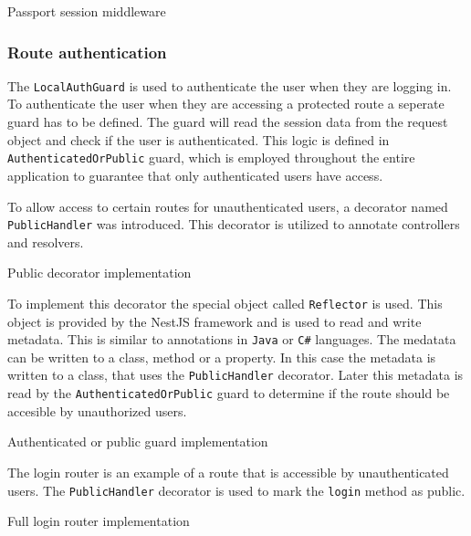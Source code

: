 \documentclass[../main.tex]{subfiles}
\begin{document}
\begin{listing}[H]
  \caption{Passport session middleware}
\end{listing}

\subsubsection{Route authentication}

The \texttt{LocalAuthGuard} is used to authenticate the user when they are logging in. To authenticate the user when they are accessing a protected route
a seperate guard has to be defined. The guard will read the session data from the request object and check if the user is authenticated.
This logic is defined in \texttt{AuthenticatedOrPublic} guard, which is employed throughout the entire application to guarantee that only authenticated users have access.


To allow access to certain routes for unauthenticated users, a decorator named \texttt{PublicHandler} was introduced. This decorator is utilized to annotate controllers and resolvers.

\begin{listing}[H]
  \caption{Public decorator implementation}
\end{listing}

To implement this decorator the special object called \texttt{Reflector} is used. This object is provided by the NestJS framework and is used to read and write metadata.
This is similar to annotations in \texttt{Java} or \texttt{C\#} languages. The medatata can be written to a class, method or a property. In this case the metadata is written to a class, that uses the \texttt{PublicHandler} decorator.
Later this metadata is read by the \texttt{AuthenticatedOrPublic} guard to determine if the route should be accesible by unauthorized users.

\begin{listing}[H]
  \caption{Authenticated or public guard implementation}
\end{listing}

The login router is an example of a route that is accessible by unauthenticated users. The \texttt{PublicHandler} decorator is used to mark the \texttt{login} method as public.

\begin{listing}[H]
  \caption{Full login router implementation}
\end{listing}
\end{document}
